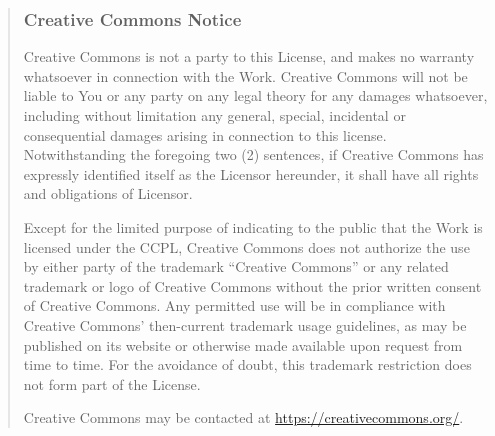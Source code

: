 \begin{quotation}
\subsubsection{Creative Commons Notice}
\par Creative Commons is not a party to this License, and
makes no warranty whatsoever in connection with the Work.
Creative Commons will not be liable to You or any party
 on any legal theory for any damages whatsoever, including
without limitation any general, special, incidental or
consequential damages arising in connection to this
license. Notwithstanding the foregoing two (2) sentences,
if Creative Commons has expressly identified itself as
the Licensor hereunder, it shall have all rights and
obligations of Licensor.
\par Except for the limited purpose of indicating to the
public that the Work is licensed under the CCPL, Creative
Commons does not authorize the use by either party of the
trademark ``Creative Commons'' or any related trademark or
logo of Creative Commons without the prior written
consent of Creative Commons. Any permitted use will be in
compliance with Creative Commons' then-current trademark
usage guidelines, as may be published on its website or
otherwise made available upon request from time to time.
For the avoidance of doubt, this trademark restriction
does not form part of the License.
\par Creative Commons may be contacted at \url{https://creativecommons.org/}.
\end{quotation}



